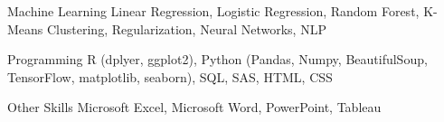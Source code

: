 

\begin{cvskills}

  \cvskill
    {Machine Learning} %
    {Linear Regression, Logistic Regression, Random Forest, K-Means Clustering, Regularization, Neural Networks, NLP}
    
  \cvskill
  	{Programming}
  	{R (dplyer, ggplot2), Python (Pandas, Numpy, BeautifulSoup, TensorFlow, matplotlib, seaborn), SQL, SAS, HTML, CSS}
  	
  \cvskill
  	{Other Skills}
  	{Microsoft Excel, Microsoft Word, PowerPoint, Tableau}
  	
\end{cvskills}